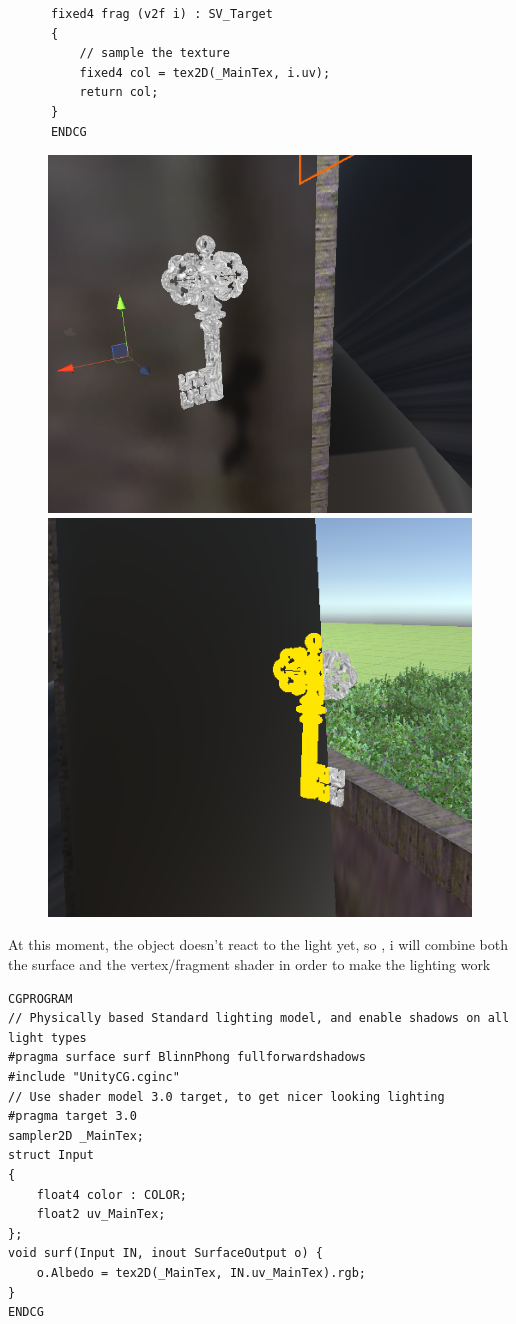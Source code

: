 \documentclass[a4paper, 13pt]{extarticle}
\begin{document}
{\begin{lstlisting}
      fixed4 frag (v2f i) : SV_Target
      {
	      // sample the texture
	      fixed4 col = tex2D(_MainTex, i.uv);
	      return col;
      }
      ENDCG
\end{lstlisting}
\begin{figure}[h]
	\begin{minipage}{.4\textwidth}
		\centering
		\includegraphics[width=0.7\linewidth]{intructions/key_with.png}
		\centering
	\end{minipage}
	\begin{minipage}{.45\textwidth}
		\centering
		\includegraphics[width=0.6\linewidth]{intructions/key_with2.png}
		\centering
	\end{minipage}
\end{figure}
At this moment, the object doesn't react to the light yet, so , i will combine both the surface and the vertex/fragment shader in order to make the lighting work

\begin{lstlisting}
CGPROGRAM
// Physically based Standard lighting model, and enable shadows on all light types
#pragma surface surf BlinnPhong fullforwardshadows
#include "UnityCG.cginc"
// Use shader model 3.0 target, to get nicer looking lighting
#pragma target 3.0
sampler2D _MainTex;
struct Input
{
	float4 color : COLOR;
	float2 uv_MainTex;
};
void surf(Input IN, inout SurfaceOutput o) {
	o.Albedo = tex2D(_MainTex, IN.uv_MainTex).rgb;
}
ENDCG
\end{lstlisting}
\newpage
~
	 \begin{figure}[h]
	

\end{figure}}
\end{document}
